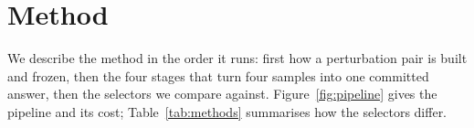 \section{Method}
\label{sec:method}
\newcommand{\yes}{\textcolor{okgreen}{\ding{51}}}
\newcommand{\no}{\textcolor{okred}{\ding{55}}}
\newcommand{\na}{\textcolor{black!45}{--}}

We describe the method in the order it runs: first how a perturbation pair is
built and frozen, then the four stages that turn four samples into one
committed answer, then the selectors we compare against.
Figure~\ref{fig:pipeline} gives the pipeline and its cost;
Table~\ref{tab:methods} summarises how the selectors differ.

